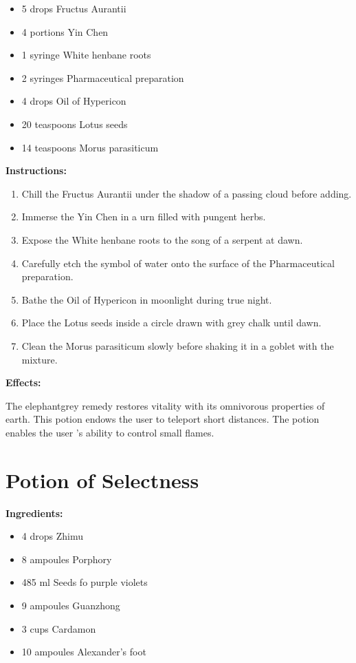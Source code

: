 \documentclass{article}
\begin{document}
\begin{itemize}
  \item 5 drops Fructus Aurantii
  \item 4 portions Yin Chen
  \item 1 syringe White henbane roots
  \item 2 syringes Pharmaceutical preparation
  \item 4 drops Oil of Hypericon
  \item 20 teaspoons Lotus seeds
  \item 14 teaspoons Morus parasiticum
\end{itemize}

\textbf{Instructions:}

\begin{enumerate}
  \item Chill the Fructus Aurantii under the shadow of a passing cloud before adding.
  \item Immerse the Yin Chen in a urn filled with pungent herbs.
  \item Expose the White henbane roots to the song of a serpent at dawn.
  \item Carefully etch the symbol of water onto the surface of the Pharmaceutical preparation.
  \item Bathe the Oil of Hypericon in moonlight during true night.
  \item Place the Lotus seeds inside a circle drawn with grey chalk until dawn.
  \item Clean the Morus parasiticum slowly before shaking it in a goblet with the mixture.
\end{enumerate}

\textbf{Effects:}

The elephantgrey remedy restores vitality with its omnivorous properties of earth. This potion endows the user to teleport short distances. The potion enables the user 's ability to control small flames.

\newpage
\section*{Potion of Selectness}

\textbf{Ingredients:}

\begin{itemize}
  \item 4 drops Zhimu
  \item 8 ampoules Porphory
  \item 485 ml Seeds fo purple violets
  \item 9 ampoules Guanzhong
  \item 3 cups Cardamon
  \item 10 ampoules Alexander's foot
\end{itemize}
\end{document}
